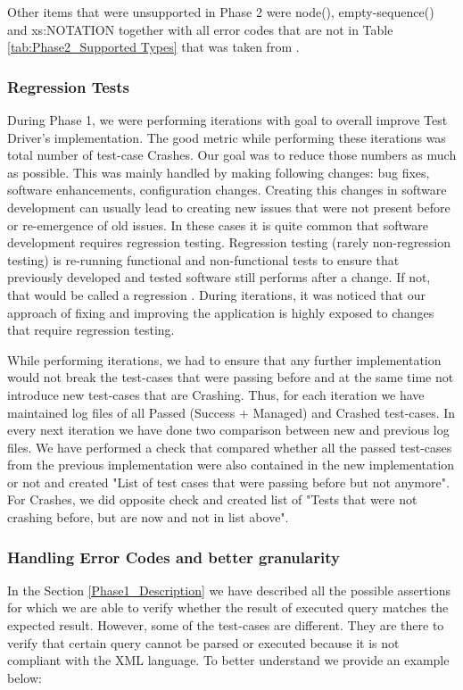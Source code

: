 Other items that were unsupported in Phase 2 were node(), empty-sequence() and xs:NOTATION together with all error codes that are not in Table \ref{tab:Phase2_Supported Types} that was taken from \cite{RumbleSupportedErrorCodes}.

\subsubsection{Regression Tests}
During Phase 1, we were performing iterations with goal to overall improve Test Driver's implementation. The good metric while performing these iterations was total number of test-case Crashes. Our goal was to reduce those numbers as much as possible. This was mainly handled by making following changes: bug fixes, software enhancements, configuration changes. Creating this changes in software development can usually lead to creating new issues that were not present before or re-emergence of old issues. In these cases it is quite common that software development requires regression testing. Regression testing (rarely non-regression testing) is re-running functional and non-functional tests to ensure that previously developed and tested software still performs after a change. If not, that would be called a regression \cite{RegressionTesting}. During iterations, it was noticed that our approach of fixing and improving the application is highly exposed to changes that require regression testing. 

While performing iterations, we had to ensure that any further implementation would not break the test-cases that were passing before and at the same time not introduce new test-cases that are Crashing. Thus, for each iteration we have maintained log files of all Passed (Success + Managed) and Crashed test-cases. In every next iteration we have done two comparison between new and previous log files. We have performed a check that compared whether all the passed test-cases from the previous implementation were also contained in the new implementation or not and created "List of test cases that were passing before but not anymore". For Crashes, we did opposite check and created list of "Tests that were not crashing before, but are now and not in list above". 

\subsubsection{Handling Error Codes and better granularity}
\label{Phase2_ErrorCodes}
In the Section \ref{Phase1_Description} we have described all the possible assertions for which we are able to verify whether the result of executed query matches the expected result. However, some of the test-cases are different. They are there to verify that certain query cannot be parsed or executed because it is not compliant with the XML language. To better understand we provide an example below:

